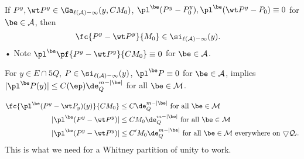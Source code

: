If $P^y,\wt P^y\in \Ga_{\ell(\cal A)-1}(y,CM_0)$, $\pl^\be (P^y-P_0^y), \pl^\be (\wt P^y - P_0)\equiv 0$ for $\be \in \cal A$, then
\begin{align}
\fc{P^y-\wt P^y}{M_0}&\in 
\si_{\ell(\cal A)-1}(y) .
\end{align}•
Note $\pl^\be\pf{P^y-\wt P^y}{CM_0}\equiv 0$ for $\be \in \cal A$.
\begin{lem}\label{lem:12-11}
For $y\in E\cap 5Q$, $P\in \si_{\ell(\cal A)-1}(y)$, $\pl^\be P\equiv 0$ for $\be\in \cal A$, implies $|\pl^\be P(y)|\le C(\ep)\de_Q^{m-|\be|}$ for all $\be\in \cal M$.
\end{lem}
\begin{align}
\fc{\pl^\be (P^y-\wt P_y)(y)}{CM_0} &\le C\de_Q^{m-|\be|} \text{ for all } \be\in \cal M\\
|\pl^\be (P^y - \wt P^y)| &\le CM_0 \de_Q^{m-|\be|}  \text{ for all $\be\in \cal M$}\\
|\pl^\be (P^y - \wt P^y)| &\le 
C' M_0 \de_Q^{m-|\be|} \text{ for all }\be \in \cal M \text{ everywhere on }5Q_0.
\end{align}
This is what we need for a Whitney partition of unity to work.

